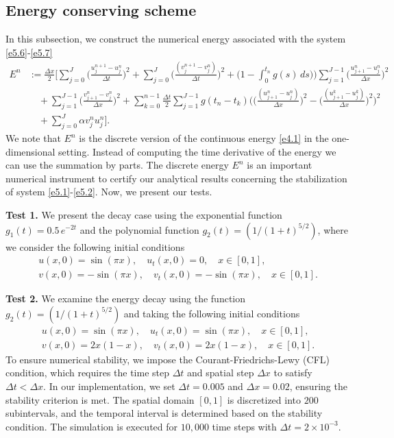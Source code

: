 \documentclass[reqno]{amsart}
\begin{document}
\subsection{Energy conserving scheme}
In this subsection, we construct the numerical energy associated with the system
\eqref{e5.6}-\eqref{e5.7}
\begin{align*}
E^n &:=  \frac{\Delta x}{2} \Big[ \sum_{j=0}^{J}
 \Big(\frac{u_j^{n+1} - u_j^n}{\Delta t} \Big)^2 + \sum_{j=0}^{J}
 \Big( \frac{(v_j^{n+1} - v_j^n) }{\Delta t} \Big)^2
 + \Big(1 - \int_0^{t_n} g(s) \, ds \big) \Big) \sum_{j=1}^{J-1}
 \Big( \frac{u_{j+1}^n - u_j^n}{\Delta x} \Big)^2 \\
&\quad + \sum_{j=1}^{J-1} \Big( \frac{v_{j+1}^n - v_j^n}{\Delta x} \Big)^2
 +\sum_{k=0}^{n-1} \frac{\Delta t}{2} \sum_{j=1}^{J-1} g(t_n - t_k)
 \Big( \Big(\frac{(u_{j+1}^n - u_j^n)}{\Delta x }\Big)^2
  - \Big(\frac{ (u_{j+1}^{k} - u_j^{k})}{\Delta x}\Big)^2 \Big)^2\\
&\quad + \sum_{j=0}^{J} \alpha v_j^n u_j^n\Big].
\end{align*}
We note that $E^n$ is the discrete version of the continuous
energy \eqref{e4.1} in the one-dimensional setting. Instead of computing the
time derivative of the energy we can use the summation by parts.
The discrete energy $E^n$ is an important numerical instrument to certify our
analytical results concerning the stabilization of system \eqref{e5.1}-\eqref{e5.2}.
Now, we present our tests.
\smallskip

\noindent\textbf{Test 1.} We present the decay case using the exponential function
$g_1(t) = 0.5 \, e^{-2t}$ and the polynomial function
$g_2(t) = (1/(1 + t)^{5/2})$, where we consider the following initial
conditions
\begin{gather*}
 u(x,0) = \sin(\pi x), \quad u_t(x,0) = 0 , \quad x \in [0,1], \\
 v(x,0) = - \sin(\pi x), \quad v_t(x,0) = - \sin(\pi x), \quad x \in [0,1].
\end{gather*}
\smallskip

\noindent\textbf{Test 2.} We examine the energy decay using the function
$g_2(t) = (1/(1 + t)^{5/2})$ and taking the following initial conditions
\begin{gather*}
 u(x,0) = \sin(\pi x), \quad u_t(x,0) = \sin(\pi x), \quad x \in [0,1], \\
 v(x,0) = 2 x(1 - x), \quad v_t(x,0) = 2 x(1 - x), \quad x \in [0,1].
\end{gather*}
To ensure numerical stability, we impose the Courant-Friedrichs-Lewy (CFL) condition,
which requires the time step $\Delta t $ and spatial step $\Delta x $ to satisfy
$\Delta t <\Delta x$. In our implementation, we set $\Delta t =0.005$ and
$\Delta x=0.02$, ensuring the stability criterion is met.
The spatial domain $[0,1]$ is discretized into $200$ subintervals, and the temporal
interval is determined based on the stability condition. The simulation is executed
for $10,000$ time steps with $\Delta t =2\times 10^{-3}$.
\end{document}
